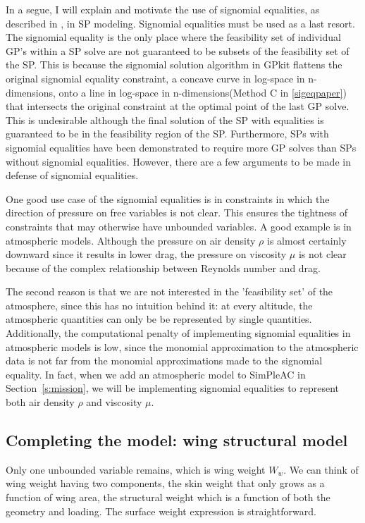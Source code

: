 In a segue, I will explain and motivate the use of signomial equalities,
as described in \cite{sigeqpaper}, in \gls{SP} modeling.
Signomial equalities must be used as a last resort. The signomial equality is the only place
where the feasibility set of individual \gls{GP}'s within a \gls{SP} solve are not guaranteed
to be subsets of the feasibility set of the \gls{SP}. This is because the signomial solution
algorithm in GPkit flattens the original signomial equality constraint,
a concave curve in log-space in n-dimensions,
onto a line in log-space in n-dimensions(Method C in \ref{sigeqpaper}) that intersects the
original constraint at the optimal point of the last \gls{GP} solve. This is undesirable although
the final solution of the \gls{SP} with equalities
is guaranteed to be in the feasibility region of the \gls{SP}. Furthermore, \gls{SP}s
with signomial equalities have been demonstrated to require more \gls{GP} solves
than \gls{SP}s without signomial equalities. However, there are a few arguments
to be made in defense of signomial equalities.

One good use case of the signomial equalities is in constraints in which the direction
of pressure on free variables is not clear. This ensures the tightness of constraints
that may otherwise have unbounded variables. A good example is in atmospheric models.
Although the pressure on air density $\rho$ is almost certainly downward since it results in
lower drag, the pressure on viscosity $\mu$ is not clear because of the complex relationship
between Reynolds number and drag.

The second reason is that we are not interested in the 'feasibility set' of the atmosphere,
since this has no intuition behind it: at every altitude, the atmospheric quantities
can only be be represented by single quantities. Additionally, the computational penalty of
implementing signomial equalities in atmospheric models is low, since the monomial approximation
to the atmospheric data is not far from the monomial approximations made to the signomial equality.
In fact, when we add an atmospheric model to SimPleAC in
Section~\ref{s:mission}, we will be implementing signomial equalities to represent both air density
$\rho$ and viscosity $\mu$.

\subsection{Completing the model: wing structural model}
\label{s:wingstrc}

Only one unbounded variable remains, which is wing weight $W_w$. We can think
of wing weight having two components, the skin weight that
only grows as a function of wing area, the structural weight which is a function of
both the geometry and loading. The surface weight expression is straightforward.

